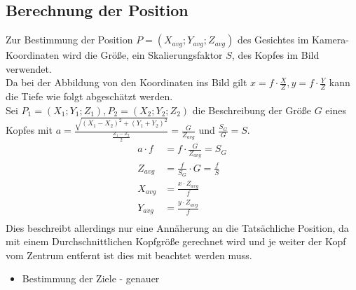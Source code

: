 \subsection{Berechnung der Position}
Zur Bestimmung der Position $P=(X_{avg};Y_{avg};Z_{avg})$ des Gesichtes im Kamera-Koordinaten wird die Größe, ein Skalierungsfaktor $S$, des Kopfes im Bild verwendet.\\
Da bei der Abbildung von den Koordinaten ins Bild gilt $x=f\cdot \frac{X}{Z}, y=f\cdot \frac{Y}{Z}$ kann die Tiefe wie folgt abgeschätzt werden.\\
Sei $P_1 = (X_1;Y_1;Z_1), P_2=(X_2;Y_2;Z_2)$ die Beschreibung der Größe $G$ eines Kopfes mit $a=\frac{\sqrt{(X_1-X_2)^2+(Y_1+Y_2)^2}}{\frac{Z_1-Z_2}{2}} =\frac{G}{Z_{avg}}$ und $\frac{S_G}{G}= S$.
\begin{align*}
a\cdot f &= f\cdot\frac{G}{Z_{avg}} = S_G\\
Z_{avg} &= \frac{f}{S_G}\cdot G = \frac{f}{S}\\
X_{avg} &= \frac{x \cdot Z_{avg}}{f}\\
Y_{avg} &= \frac{y \cdot Z_{avg}}{f}\\
\end{align*}
Dies beschreibt allerdings nur eine Annäherung an die Tatsächliche Position, da mit einem Durchschnittlichen Kopfgröße gerechnet wird und je weiter der Kopf vom Zentrum entfernt ist dies mit beachtet werden muss.
\begin{itemize}
\item Bestimmung der Ziele - genauer
\end{itemize}